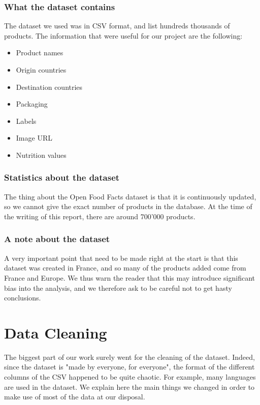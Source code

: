 \documentclass[11pt]{article}
\begin{document}
\subsubsection{What the dataset contains}
The dataset we used was in CSV format, and list hundreds thousands of products. The information that were useful for our project are the following:

\begin{itemize}
\itemsep0em
    \item Product names
    \item Origin countries
    \item Destination countries
    \item Packaging
    \item Labels
    \item Image URL
    \item Nutrition values
\end{itemize}

\subsubsection{Statistics about the dataset}
The thing about the Open Food Facts dataset is that it is continuously updated, so we cannot give the exact number of products in the database. At the time of the writing of this report, there are around 700'000 products.

\subsubsection{A note about the dataset}
A very important point that need to be made right at the start is that this dataset was created in France, and so many of the products added come from France and Europe. We thus warn the reader that this may introduce significant bias into the analysis, and we therefore ask to be careful not to get hasty conclusions.

\section{Data Cleaning}

The biggest part of our work surely went for the cleaning of the dataset. Indeed, since the dataset is "made by everyone, for everyone", the format of the different columns of the CSV happened to be quite chaotic. For example, many languages are used in the dataset. We explain here the main things we changed in order to make use of most of the data at our disposal.
\end{document}
